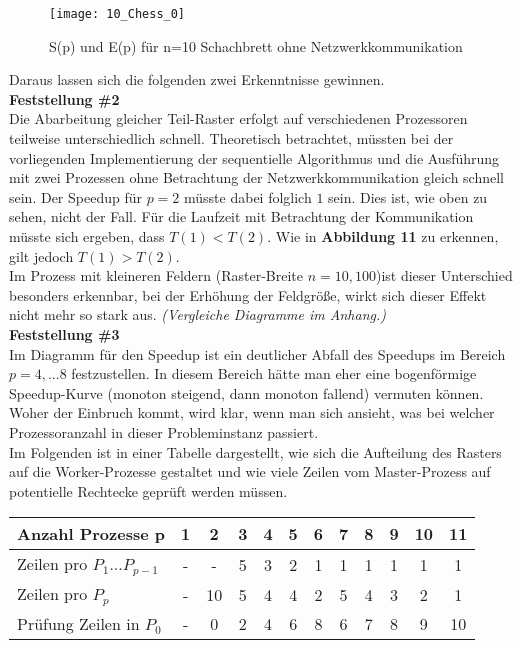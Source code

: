 \documentclass[
10pt, %
a4paper, %
oneside, %
headinclude,footinclude, %
BCOR5mm, %
]{scrartcl}
\begin{document}
\begin{figure}[h]
	\centering 
	\texttt{[image: 10\_Chess\_0]} 
	\caption[S(p) und E(p) für n=10 Schachbrett ohne Netzwerkkomm.]{S(p) und E(p) für n=10 Schachbrett ohne Netzwerkkommunikation}
\end{figure}

Daraus lassen sich die folgenden zwei Erkenntnisse gewinnen.\\

\textbf{Feststellung \#2}\\
Die Abarbeitung gleicher Teil-Raster erfolgt auf verschiedenen Prozessoren teilweise unterschiedlich schnell. Theoretisch betrachtet, müssten bei der vorliegenden Implementierung der sequentielle Algorithmus und die Ausführung mit zwei Prozessen ohne Betrachtung der Netzwerkkommunikation gleich schnell sein. Der Speedup für \(p=2\) müsste dabei folglich \(1\) sein. Dies ist, wie oben zu sehen, nicht der Fall. Für die Laufzeit mit Betrachtung der Kommunikation müsste sich ergeben, dass \(T(1)<T(2)\). Wie in \textbf{Abbildung 11} zu erkennen, gilt jedoch \(T(1)>T(2)\).\\
Im Prozess mit kleineren Feldern (Raster-Breite \(n= {10,100}\))ist dieser Unterschied besonders erkennbar, bei der Erhöhung der Feldgröße, wirkt sich dieser Effekt nicht mehr so stark aus. \textit{(Vergleiche Diagramme im Anhang.)}\\

\textbf{Feststellung \#3}\\
Im Diagramm für den Speedup ist ein deutlicher Abfall des Speedups im Bereich \(p={4,...8}\) festzustellen. In diesem Bereich hätte man eher eine bogenförmige Speedup-Kurve (monoton steigend, dann monoton fallend) vermuten können. Woher der Einbruch kommt, wird klar, wenn man sich ansieht, was bei welcher Prozessoranzahl in dieser Probleminstanz passiert.\\
Im Folgenden ist in einer Tabelle dargestellt, wie sich die Aufteilung des Rasters auf die Worker-Prozesse gestaltet und wie viele Zeilen vom Master-Prozess auf potentielle Rechtecke geprüft werden müssen.\\

\begin{tabular}{l|c|c|c|c|c|c|c|c|c|c|c|}
\hline 
Anzahl Prozesse p & 1 & 2 & 3 & 4 & 5 & 6 & 7 & 8  & 9 &  10 & 11\\ 
\hline 
Zeilen pro \(P_1 ... P_{p-1}\) & - & - & 5 & 3 & 2 & 1 & 1 & 1  & 1 &  1 & 1\\
\hline 
Zeilen pro \(P_{p}\) & - & 10 & 5 & 4 & 4 & 2 & 5 & 4  & 3 &  2 & 1\\
\hline 
Prüfung Zeilen in \(P_{0}\) & - & 0 & 2 & 4 & 6 & 8 & 6 & 7  & 8 &  9 & 10\\
\hline 
\end{tabular}\\
\end{document}
